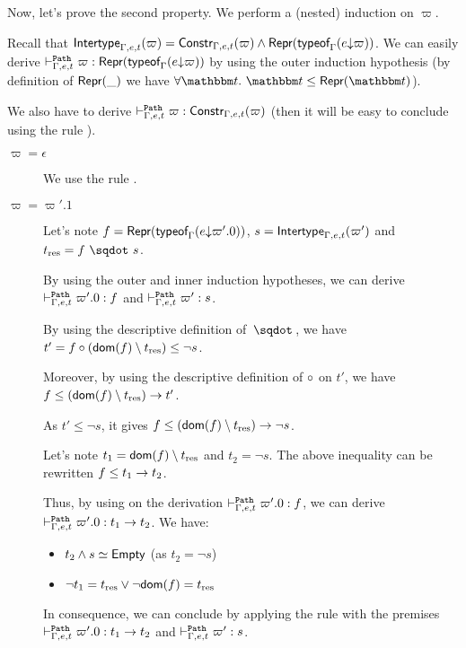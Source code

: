 \documentclass[a4paper]{article}
\theoremstyle{definition}
\begin{document}
  Now, let's prove the second property.
  We perform a (nested) induction on $\varpi$.

  Recall that $\textsf{Intertype}_{\Gamma,e,t} (\varpi) = \textsf{Constr}_{\Gamma,e,t}(\varpi) \land \textsf{Repr}(\textsf{typeof}_{\Gamma}(e{\downarrow}\varpi))$.
  We can easily derive $\vdash^{\texttt{Path}}_{\Gamma,e,t} \varpi : \textsf{Repr}(\textsf{typeof}_{\Gamma}(e{\downarrow}\varpi))$ by using the outer induction hypothesis
  (by definition of $\textsf{Repr}(\_)$ we have $\forall \ts.\ \ts \leq \tsrep \ts$).

  We also have to derive $\vdash^{\texttt{Path}}_{\Gamma,e,t} \varpi : \textsf{Constr}_{\Gamma,e,t}(\varpi)$ (then it will be easy to conclude using the rule ).
  \begin{description}
    \item[$\varpi=\epsilon$] We use the rule .
    \item[$\varpi=\varpi'.1$]
    Let's note $f=\textsf{Repr}(\textsf{typeof}_{\Gamma}(e{\downarrow}\varpi'.0))$, $s=\textsf{Intertype}_{\Gamma,e,t} (\varpi')$ and $t_{\text{res}} = \worra f s$. 
    
    By using the outer and inner induction hypotheses, we can derive $\vdash^{\texttt{Path}}_{\Gamma,e,t} \varpi'.0 : f$ and $\vdash^{\texttt{Path}}_{\Gamma,e,t} \varpi' : s$.

    By using the descriptive definition of $\worra {} {}$, we have $t' = f\circ(\textsf{dom}(f) \setminus t_{\text{res}}) \leq \neg s$.

    Moreover, by using the descriptive definition of $\circ$ on $t'$, we have
    $f \leq (\textsf{dom}(f) \setminus t_{\text{res}})\to t'$.

    As $t'\leq \neg s$, it gives $f \leq (\textsf{dom}(f) \setminus t_{\text{res}})\to \neg s$.

    Let's note $t_1 = \textsf{dom}(f) \setminus t_{\text{res}}$ and $t_2 = \neg s$. The above inequality can be rewritten $f \leq t_1\to t_2$.

    Thus, by using  on the derivation $\vdash^{\texttt{Path}}_{\Gamma,e,t} \varpi'.0 : f$, we can derive $\vdash^{\texttt{Path}}_{\Gamma,e,t} \varpi'.0 : t_1\to t_2$.
    We have:
    \begin{itemize}
      \item $t_2 \land s \simeq \textsf{Empty}$ (as $t_2 = \neg s$)
      \item $\neg t_1 = t_{\text{res}} \vee \neg \textsf{dom}(f) = t_{\text{res}}$
    \end{itemize}
    
    In consequence, we can conclude by applying the rule 
    with the premises $\vdash^{\texttt{Path}}_{\Gamma,e,t} \varpi'.0 : t_1\to t_2$ and $\vdash^{\texttt{Path}}_{\Gamma,e,t} \varpi' : s$.


\end{description}
\end{document}
